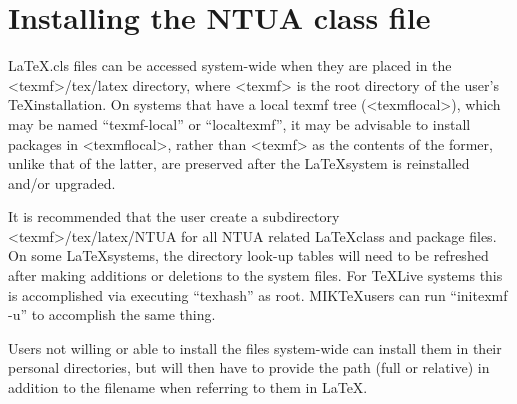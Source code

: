 
\chapter{Installing the NTUA class file}

\LaTeX.cls files can be accessed system-wide when they are placed in the
<texmf>/tex/latex directory, where <texmf> is the root directory of the user’s \TeX installation. On systems that have a local texmf tree (<texmflocal>), which
may be named ``texmf-local'' or ``localtexmf'', it may be advisable to install packages in <texmflocal>, rather than <texmf> as the contents of the former, unlike that of the latter, are preserved after the \LaTeX system is reinstalled and/or upgraded.

It is recommended that the user create a subdirectory <texmf>/tex/latex/NTUA for all NTUA related \LaTeX class and package files. On some \LaTeX systems, the directory look-up tables will need to be refreshed after making additions or deletions to the system files. For \TeX Live systems this is accomplished via executing ``texhash'' as root. MIK\TeX users can run ``initexmf -u'' to accomplish the same thing.

Users not willing or able to install the files system-wide can install them in their personal directories, but will then have to provide the path (full or relative) in addition to the filename when referring to them in \LaTeX.

